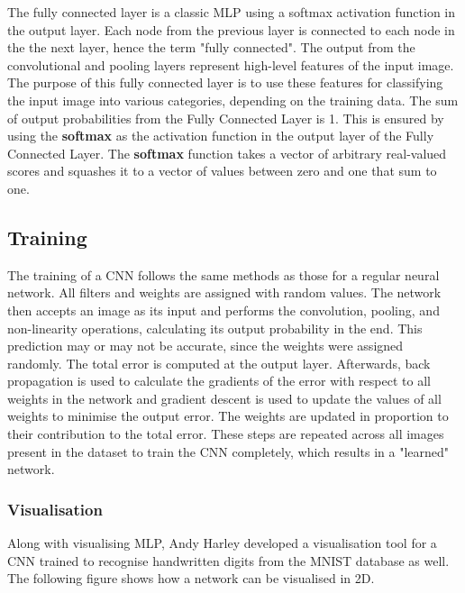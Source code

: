 The fully connected layer is a classic \ac{MLP} using a softmax activation function in the output layer. Each node from the previous layer is connected to each node in the the next layer, hence the term "fully connected".\newline\newline
The output from the convolutional and pooling layers represent high-level features of the input image. The purpose of this fully connected layer is to use these features for classifying the input image into various categories, depending on the training data. \newline\newline
The sum of output probabilities from the Fully Connected Layer is 1. This is ensured by using the \textbf{softmax} as the activation function in the output layer of the Fully Connected Layer. The \textbf{softmax} function takes a vector of arbitrary real-valued scores and squashes it to a vector of values between zero and one that sum to one.

\subsection*{Training}
\label{sect5_1_2_1b}
The training of a CNN follows the same methods as those for a regular neural network. All filters and weights are assigned with random values. The network then accepts an image as its input and performs the convolution, pooling, and non-linearity operations, calculating its output probability in the end. This prediction may or may not be accurate, since the weights were assigned randomly.\newline\newline
The total error is computed at the output layer. Afterwards, back propagation is used to calculate the gradients of the error with respect to all weights in the network and gradient descent is used to update the values of all weights to minimise the output error. The weights are updated in proportion to their contribution to the total error. \newline\newline
These steps are repeated across all images present in the dataset to train the CNN completely, which results in a "learned" network. 
\subsubsection{Visualisation}
\label{sect5_1_2_2}
Along with visualising \ac{MLP}, Andy Harley developed a visualisation tool for a CNN trained to recognise handwritten digits from the MNIST database \cite{harley2015isvc} as well. \newline\newline
The following figure shows how a network can be visualised in 2D.

